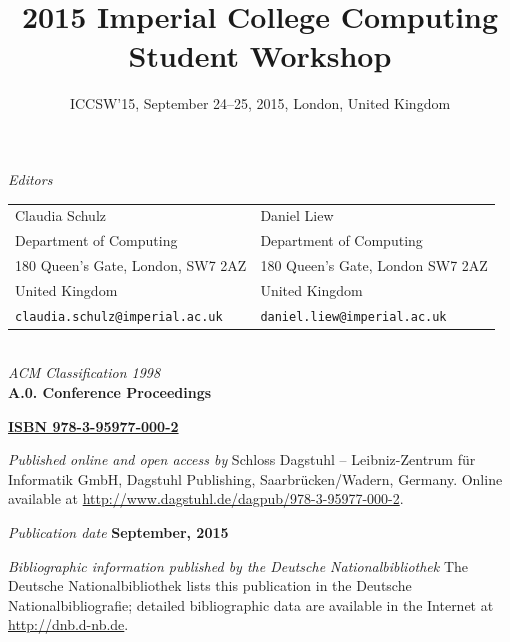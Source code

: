 \documentclass[a4paper,UKenglish]{oasicsmaster}
\title{\huge 2015 Imperial College Computing Student Workshop}
\subtitle{ICCSW'15, September 24--25, 2015, London, United Kingdom}
\begin{document}
\frontmatter

\maketitle

\begin{publicationinfo}%
\sffamily

\emph{Editors} \\[0.2cm]
\begin{tabular}{ll}
Claudia Schulz              &   Daniel Liew   \\
Department of Computing                  & Department of Computing \\
180 Queen's Gate, London, SW7 2AZ        & 180 Queen's Gate, London SW7 2AZ \\
United Kingdom                           & United Kingdom \\
\texttt{claudia.schulz@imperial.ac.uk} &  \texttt{daniel.liew@imperial.ac.uk}
\end{tabular}
\ \\

\bigskip
\bigskip
\bigskip
\bigskip
\emph{ACM Classification 1998}\\
\textbf{A.0. Conference Proceedings}

\bigskip
\bigskip

{\Large\bf\sffamily \href{http://www.dagstuhl.de/dagpub/978-3-95977-000-2}{ISBN 978-3-95977-000-2}}

\bigskip
\bigskip

\emph{Published online and open access by}\newline
Schloss Dagstuhl -- Leibniz-Zentrum f\"ur Informatik GmbH, Dagstuhl Publishing, Saarbr\"ucken/Wadern, Germany. Online available at \href{http://www.dagstuhl.de/dagpub/978-3-95977-000-2}{http://www.dagstuhl.de/dagpub/978-3-95977-000-2}.

\bigskip
\emph{Publication date}\newline
\textbf{September, 2015}

\bigskip
\bigskip

\emph{Bibliographic information published by the Deutsche Nationalbibliothek}\newline
The Deutsche Nationalbibliothek lists this publication in the Deutsche Nationalbibliografie; detailed bibliographic data are available in the Internet at \href{http://dnb.d-nb.de}{http://dnb.d-nb.de}. 

\bigskip


\end{publicationinfo}
\end{document}
